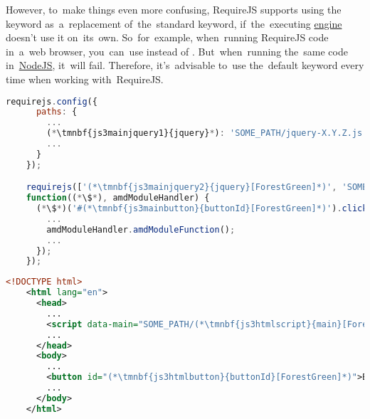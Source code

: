 However, to~make things even more confusing, RequireJS supports using \mbox{the } keyword as~a~replacement of~the~standard  keyword, if~the~executing \hyperref[engine]{engine} doesn't use it on~its~own.
So~for~example, when~running RequireJS code in~a~web browser, you~can~use  instead of .
But~when~running the~same code in~\hyperref[nodejs]{NodeJS}, it~will fail.
Therefore, it's~advisable to~use the~default  keyword every time when working with~RequireJS.
\newpage

\begin{lstlisting}[language=JavaScript, title={Main JavaScript file \textit{\tmnbf{js3mainscript}{main}.js}}]
    requirejs.config({
      paths: {
        ...
        (*\tmnbf{js3mainjquery1}{jquery}*): 'SOME_PATH/jquery-X.Y.Z.js'
        ...
      }
    });

    requirejs(['(*\tmnbf{js3mainjquery2}{jquery}[ForestGreen]*)', 'SOME_PATH/amd_module'],
    function((*\$*), amdModuleHandler) {
      (*\$*)('#(*\tmnbf{js3mainbutton}{buttonId}[ForestGreen]*)').click(function() {
        ...
        amdModuleHandler.amdModuleFunction();
        ...
      });
    });
\end{lstlisting}
\begin{lstlisting}[language=XML, title={Web page file loading the JavaScript file}]
    <!DOCTYPE html>
    <html lang="en">
      <head>
        ...
        <script data-main="SOME_PATH/(*\tmnbf{js3htmlscript}{main}[ForestGreen]*)" src="SOME_OTHER_PATH/require.js"></script>
        ...
      </head>
      <body>
        ...
        <button id="(*\tmnbf{js3htmlbutton}{buttonId}[ForestGreen]*)">BUTTON_LABEL</button>
        ...
      </body>
    </html>
\end{lstlisting}
\newpage
